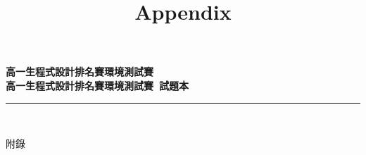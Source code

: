 \documentclass[a4paper]{article}
\title{Appendix}
\begin{document}
\begin{center}
\textbf{\huge 高一生程式設計排名賽環境測試賽}\\
\vspace{5mm}
\textbf{\huge 高一生程式設計排名賽環境測試賽\ 試題本}\\
\vspace{10mm}
\rule{17cm}{2pt}\\
\vspace{5mm}

\huge 附錄\\
\end{center}

\fontsize{14pt}{20pt}\selectfont

\noindent
\end{document}
